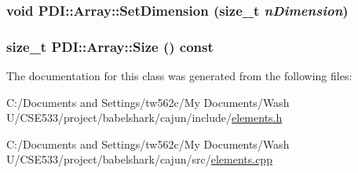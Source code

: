 \hypertarget{class_p_d_i_1_1_array_19bc4e564ec03997f2ae3efad54b0c27}{
\subsubsection[{SetDimension}]{\setlength{\rightskip}{0pt plus 5cm}void PDI::Array::SetDimension (size\_\-t {\em nDimension})}}
\label{class_p_d_i_1_1_array_19bc4e564ec03997f2ae3efad54b0c27}


\hypertarget{class_p_d_i_1_1_array_27eaf51b3986777c67ed6832ebfc47f6}{
\subsubsection[{Size}]{\setlength{\rightskip}{0pt plus 5cm}size\_\-t PDI::Array::Size () const}}
\label{class_p_d_i_1_1_array_27eaf51b3986777c67ed6832ebfc47f6}




The documentation for this class was generated from the following files:\begin{CompactItemize}
\item 
C:/Documents and Settings/tw562c/My Documents/Wash U/CSE533/project/babelshark/cajun/include/\hyperlink{elements_8h}{elements.h}\item 
C:/Documents and Settings/tw562c/My Documents/Wash U/CSE533/project/babelshark/cajun/src/\hyperlink{elements_8cpp}{elements.cpp}\end{CompactItemize}
